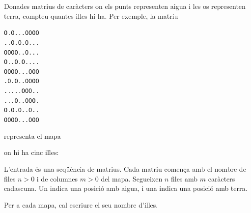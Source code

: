 

\Statement

Donades matrius de caràcters on els punts representen aigua
i les os representen terra, compteu quantes illes hi ha.
Per exemple, la matriu

\bigskip

\texttt{\hspace*{6.5cm}O.O...OOOO\\
\hspace*{6.5cm}..O.O.O...\\
\hspace*{6.5cm}OOOO..O...\\
\hspace*{6.5cm}O..O.O....\\
\hspace*{6.5cm}OOOO...OOO\\
\hspace*{6.5cm}.O.O..OOOO\\
\hspace*{6.5cm}.....OOO..\\
\hspace*{6.5cm}...O..OOO.\\
\hspace*{6.5cm}O.O.O..O..\\
\hspace*{6.5cm}OOOO...OOO\\
}

representa el mapa


on hi ha cinc illes:


\Input

L'entrada és una seqüència de matrius.
Cada matriu comença amb el nombre de files $n > 0$
i de columnes $m > 0$ del mapa.
Segueixen $n$ files amb $m$ caràcters cadascuna.
Un  indica una posició amb aigua,
i una  indica una posició amb terra.


\Output

Per a cada mapa, cal escriure el seu nombre d'illes.


\Sample
